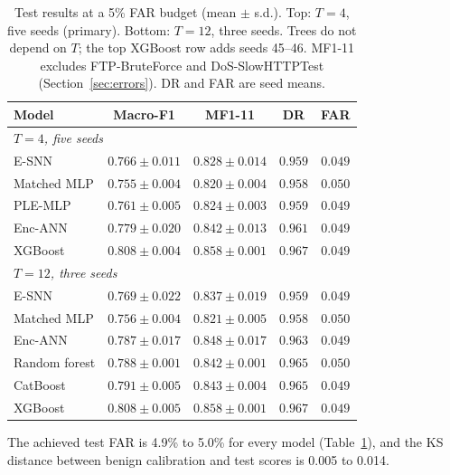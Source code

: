 \documentclass[conference]{IEEEtran}
\begin{document}
\begin{table}[t]
\centering
\caption{Test results at a 5\% FAR budget (mean $\pm$ s.d.). Top: $T = 4$, five seeds (primary). Bottom: $T = 12$, three seeds. Trees do not depend on $T$; the top XGBoost row adds seeds 45--46. MF1-11 excludes FTP-BruteForce and DoS-SlowHTTPTest (Section~\ref{sec:errors}). DR and FAR are seed means.}
\label{tab:main}
\setlength{\tabcolsep}{2.5pt}
\begin{tabular}{lcccc}
\toprule
Model & Macro-F1 & MF1-11 & DR & FAR \\
\midrule
\multicolumn{5}{l}{\emph{$T = 4$, five seeds}} \\
E-SNN & $0.766 \pm 0.011$ & $0.828 \pm 0.014$ & $0.959$ & $0.049$ \\
Matched MLP & $0.755 \pm 0.004$ & $0.820 \pm 0.004$ & $0.958$ & $0.050$ \\
PLE-MLP & $0.761 \pm 0.005$ & $0.824 \pm 0.003$ & $0.959$ & $0.049$ \\
Enc-ANN & $0.779 \pm 0.020$ & $0.842 \pm 0.013$ & $0.961$ & $0.049$ \\
XGBoost & $0.808 \pm 0.004$ & $0.858 \pm 0.001$ & $0.967$ & $0.049$ \\
\midrule
\multicolumn{5}{l}{\emph{$T = 12$, three seeds}} \\
E-SNN & $0.769 \pm 0.022$ & $0.837 \pm 0.019$ & $0.959$ & $0.049$ \\
Matched MLP & $0.756 \pm 0.004$ & $0.821 \pm 0.005$ & $0.958$ & $0.050$ \\
Enc-ANN & $0.787 \pm 0.017$ & $0.848 \pm 0.017$ & $0.963$ & $0.049$ \\
Random forest & $0.788 \pm 0.001$ & $0.842 \pm 0.001$ & $0.965$ & $0.050$ \\
CatBoost & $0.791 \pm 0.005$ & $0.843 \pm 0.004$ & $0.965$ & $0.049$ \\
XGBoost & $0.808 \pm 0.005$ & $0.858 \pm 0.001$ & $0.967$ & $0.049$ \\
\bottomrule
\end{tabular}
\end{table}

The achieved test FAR is 4.9\% to 5.0\% for every model (Table~\ref{tab:main}), and the KS distance between benign calibration and test scores is 0.005 to 0.014.
\end{document}
